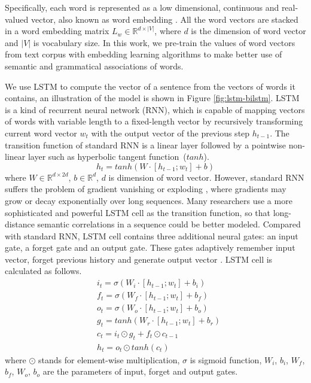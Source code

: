 \documentclass[11pt]{article}
\begin{document}
Specifically, each word is represented as a low dimensional, continuous and real-valued vector, also known as word embedding \cite{Bengio2003,Mikolov2013a,Pennington2014,Tang2014}.
All the word vectors are stacked in a word embedding matrix $L_w \in \mathbb{R}^{d \times |V|}$, where $d$ is the dimension of word vector and $|V|$ is vocabulary size.
In this work, we pre-train the values of word vectors from text corpus with embedding learning algorithms \cite{Pennington2014,Tang2014} to make better use of semantic and grammatical associations of words. 


We use LSTM to compute the vector of a sentence from the vectors of words it contains, an illustration of the model is shown in Figure \ref{fig:lstm-bilstm}. LSTM is a kind of recurrent neural network (RNN), which is capable of mapping vectors of words with variable length to a fixed-length vector by recursively transforming current word vector $w_t$ with the output vector of the previous step $h_{t-1}$. 
The transition function of standard RNN is a linear layer followed by a pointwise non-linear layer such as hyperbolic tangent function~($tanh$).
\begin{equation}
h_t = tanh(W \cdot [h_{t-1};w_{t}] + b)
\end{equation}
where $W \in \mathbb{R}^{d \times 2d }$, $b \in \mathbb{R}^{d}$, $d$ is dimension of word vector. 
However, standard RNN suffers the problem of gradient vanishing or exploding \cite{Bengio1994,Hochreiter1997}, where gradients may grow or decay exponentially over long sequences.
Many researchers use a more sophisticated and powerful LSTM cell as the transition function, so that long-distance semantic correlations in a sequence could be better modeled. 
Compared with standard RNN, LSTM cell contains three additional neural gates: an input gate, a forget gate and an output gate. 
These gates adaptively remember input vector, forget previous history and generate output vector \cite{Hochreiter1997}. LSTM cell is calculated as follows.
\begin{align} 
& i_t = \sigma(W_i \cdot [h_{t-1};w_{t}] + b_i)\\
& f_t = \sigma(W_f \cdot [h_{t-1};w_{t}] + b_f)\\
& o_t = \sigma(W_o \cdot [h_{t-1};w_{t}] + b_o)\\
& g_t = tanh(W_r \cdot [h_{t-1};w_{t}] + b_r)\\
& c_t = i_t \odot g_t + f_t \odot c_{t-1}\\
& h_t = o_t \odot tanh(c_t)
\end{align}
where $\odot$ stands for element-wise multiplication, $\sigma$ is sigmoid function, $W_i$, $b_i$, $W_f$, $b_f$, $W_o$, $b_o$ are the parameters of input, forget and output gates. 
\end{document}
